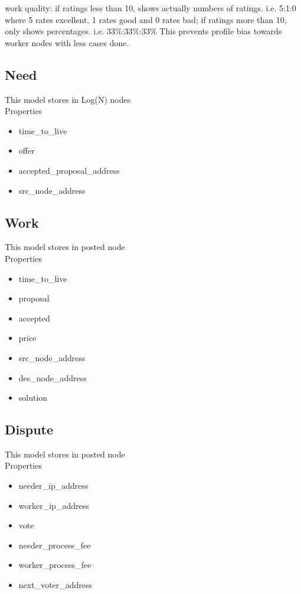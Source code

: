 \documentclass[12pt]{article}
\begin{document}
work quality:
if ratings less than 10, shows actually numbers of ratings. i.e. 5:1:0 where 5 rates excellent, 1 rates good and 0 rates bad;
if ratings more than 10, only shows percentages. i.e. 33\%:33\%:33\% This prevents profile bias towards worker nodes with less cases done.

\subsection{Need}
This model stores in Log(N) nodes\\
Properties
\begin{itemize}
	\item time\_to\_live
	\item offer
	\item accepted\_proposal\_address
	\item src\_node\_address
\end{itemize}

\subsection{Work}
This model stores in posted node\\
Properties
\begin{itemize}
	\item time\_to\_live
	\item proposal
	\item accepted
	\item price
	\item src\_node\_address
	\item des\_node\_address
	\item solution
\end{itemize}

\subsection{Dispute}
This model stores in posted node\\
Properties
\begin{itemize}
	\item needer\_ip\_address
	\item worker\_ip\_address
	\item vote
	\item needer\_process\_fee
	\item worker\_process\_fee
	\item next\_voter\_address
\end{itemize}
\end{document}
